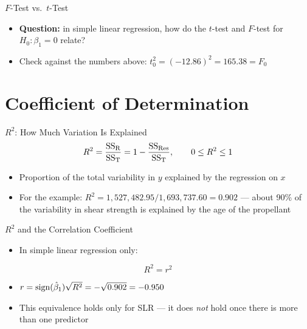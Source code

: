 \begin{frame}{$F$-Test vs.\ $t$-Test}
	\begin{itemize}
	\item[] \textbf{Question:} in simple linear regression, how do the $t$-test and $F$-test for $H_0:\beta_1=0$ relate?
	\end{itemize}

	\svspace{1em}

	\begin{itemize}
		\item Check against the numbers above: $t_0^2=(-12.86)^2=165.38=F_0$
	\end{itemize}
\end{frame}


\section{Coefficient of Determination}


\begin{frame}{$R^2$: How Much Variation Is Explained}
	\[
		R^2 = \frac{\mathrm{SS}_{\mathrm{R}}}{\mathrm{SS}_{\mathrm{T}}} = 1-\frac{\mathrm{SS}_{\mathrm{Res}}}{\mathrm{SS}_{\mathrm{T}}}, \qquad 0\le R^2\le 1
	\]
	\begin{itemize}
		\item Proportion of the total variability in $y$ explained by the regression on $x$
		\item For the example: $R^2=1{,}527{,}482.95/1{,}693{,}737.60=0.902$ --- about 90\% of the variability in shear strength is explained by the age of the propellant
	\end{itemize}
\end{frame}


\begin{frame}{$R^2$ and the Correlation Coefficient}
	\begin{itemize}
		\item In simple linear regression only:
	\end{itemize}
	\[
		R^2 = r^2
	\]
	\begin{itemize}
		\item $r= \operatorname{sign}(\hat{\beta}_1) \sqrt{R^2} = - \sqrt{0.902}= - 0.950$
		\item This equivalence holds only for SLR --- it does \emph{not} hold once there is more than one predictor
	\end{itemize}
\end{frame}


